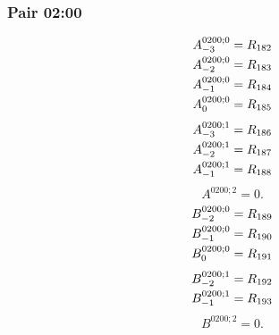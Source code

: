 \documentclass[11pt,a4paper]{article}
\begin{document}
\subsubsection{Pair 02:00}
\begin{equation}
\shortstack[l]{$\displaystyle A^{0200;0}_{-3}=R_{182}$\\
$\displaystyle A^{0200;0}_{-2}=R_{183}$\\
$\displaystyle A^{0200;0}_{-1}=R_{184}$\\
$\displaystyle A^{0200;0}_{0}=R_{185}$}
\label{eq:cat-map-162}
\end{equation}
\begin{equation}
\shortstack[l]{$\displaystyle A^{0200;1}_{-3}=R_{186}$\\
$\displaystyle A^{0200;1}_{-2}=R_{187}$\\
$\displaystyle A^{0200;1}_{-1}=R_{188}$}
\label{eq:cat-map-163}
\end{equation}
\begin{equation}
A^{0200;2}=0.
\label{eq:cat-map-164}
\end{equation}
\begin{equation}
\shortstack[l]{$\displaystyle B^{0200;0}_{-2}=R_{189}$\\
$\displaystyle B^{0200;0}_{-1}=R_{190}$\\
$\displaystyle B^{0200;0}_{0}=R_{191}$}
\label{eq:cat-map-165}
\end{equation}
\begin{equation}
\shortstack[l]{$\displaystyle B^{0200;1}_{-2}=R_{192}$\\
$\displaystyle B^{0200;1}_{-1}=R_{193}$}
\label{eq:cat-map-166}
\end{equation}
\begin{equation}
B^{0200;2}=0.
\label{eq:cat-map-167}
\end{equation}
\end{document}
